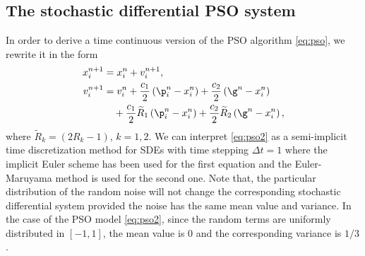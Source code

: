 \documentclass{ims9x6}
\begin{document}
\subsection{The stochastic differential PSO system}
In order to derive a time continuous version of the PSO algorithm \eqref{eq:pso}, we rewrite it in the form
\begin{equation}
\begin{split}
x^{n+1}_i &= x_i^n + {v_i^{n+1}},\\
v^{n+1}_i &= v_i^n + \frac{c_1}{2}\left(\p_i^n-x_i^n\right)+\frac{c_2}{2}\left(\g^n-x_i^n\right) \\
&\quad +\frac{c_1}{2}\widetilde R_1\left(\p_i^n-x_i^n\right)+\frac{c_2}{2}\widetilde R_2\left(\g^n-x_i^n\right),
\end{split}
\label{eq:pso2}
\end{equation} 
where $\widetilde R_k=(2R_k-1)$, $k=1,2$. We can interpret \eqref{eq:pso2} as a semi-implicit time discretization method for SDEs with time stepping $\Delta t=1$ where the implicit Euler scheme has been used for the first equation and the Euler-Maruyama method is used for the second one. Note that, the particular distribution of the random noise will not change the corresponding stochastic differential system provided the noise has the same mean value and variance. In the case of the PSO model \eqref{eq:pso2}, since the random terms are uniformly distributed in $[-1,1]$, the mean value is $0$ and the corresponding variance is $1/3$. 
\end{document}
